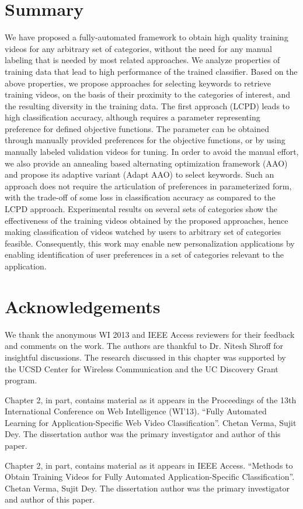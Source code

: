 \section{Summary}
\label{sec:conclusion}

We have proposed a fully-automated framework to obtain high quality training videos for any arbitrary set of categories, without the need for any manual labeling that is needed by most related approaches. We analyze properties of training data that lead to high performance of the trained classifier. Based on the above properties, we propose approaches for selecting keywords to retrieve training videos, on the basis of their proximity to the categories of interest, and the resulting diversity in the training data. The first approach (LCPD) leads to high classification accuracy, although requires a parameter representing preference for defined objective functions. The parameter can be obtained through manually provided preferences for the objective functions, or by using manually labeled validation videos for tuning. In order to avoid the manual effort, we also provide an annealing based alternating optimization framework (AAO) and propose its adaptive variant (Adapt AAO) to select keywords. Such an approach does not require the articulation of preferences in parameterized form, with the trade-off of some loss in classification accuracy as compared to the LCPD approach. Experimental results on several sets of categories show the effectiveness of the training videos obtained by the proposed approaches, hence making classification of videos watched by users to arbitrary set of categories feasible. Consequently, this work may enable new personalization applications by enabling identification of user preferences in a set of categories relevant to the application.

\section{Acknowledgements} 

We thank the anonymous WI 2013 and IEEE Access reviewers for their feedback and comments on the work. The authors are thankful to Dr. Nitesh Shroff for insightful discussions. The research discussed in this chapter was supported by the UCSD Center for Wireless Communication and the UC Discovery Grant program. 

Chapter 2, in part, contains material as it appears in the Proceedings of the 13th International Conference on Web Intelligence (WI'13). ``Fully Automated Learning for Application-Specific Web Video Classification''. Chetan Verma, Sujit Dey. The dissertation author was the primary investigator and author of this paper. 

Chapter 2, in part, contains material as it appears in IEEE Access. ``Methods to Obtain Training Videos for Fully Automated Application-Specific Classification''. Chetan Verma, Sujit Dey. The dissertation author was the primary investigator and author of this paper. 

